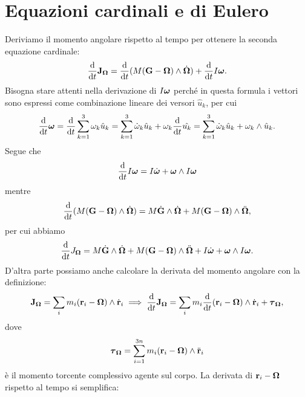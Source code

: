     \section{Equazioni cardinali e di Eulero}
    Deriviamo il momento angolare rispetto al tempo per ottenere la seconda equazione cardinale:
    \begin{equation}
        \frac{\mathrm{d}}{\mathrm{d}t} \mathbf{J}_{\boldsymbol{\Omega}} = \frac{\mathrm{d}}{\mathrm{d}t}(M(\mathbf{G}-\boldsymbol{\Omega})\wedge \dot{\boldsymbol{\Omega}})+ \frac{\mathrm{d}}{\mathrm{d}t} I\boldsymbol{\omega}.
    \end{equation}
    Bisogna stare attenti nella derivazione di $I\boldsymbol{\omega}$ perché in questa formula i vettori sono espressi come combinazione lineare dei versori $\hat{u}_k$, per cui
    \begin{equation}
        \frac{\mathrm{d}}{\mathrm{d}t} \boldsymbol{\omega} = \frac{\mathrm{d}}{\mathrm{d}t} \sum_{k=1}^3 \omega_k \hat{u}_k = \sum_{k=1}^3 \dot{\omega}_k\hat{u}_k + \omega_k\frac{\mathrm{d}}{\mathrm{d}t} \hat{u_k} = \sum_{k=1}^3 \dot{\omega}_k\hat{u}_k +\omega_k\wedge\hat{u}_k.
    \end{equation}
    Segue che
    \begin{equation}
        \frac{\mathrm{d}}{\mathrm{d}t} I\boldsymbol{\omega} = I\dot{\boldsymbol{\omega}}+\boldsymbol{\omega}\wedge I\boldsymbol{\omega}
    \end{equation}
    mentre
    \begin{equation}
        \frac{\mathrm{d}}{\mathrm{d}t}(M(\mathbf{G}-\boldsymbol{\Omega})\wedge \dot{\boldsymbol{\Omega}}) = M\dot{\mathbf{G}}\wedge\dot{\boldsymbol{\Omega}} + M(\mathbf{G}-\boldsymbol{\Omega})\wedge\ddot{\boldsymbol{\Omega}},
    \end{equation}
    per cui abbiamo
    \begin{equation}
        \frac{\mathrm{d}}{\mathrm{d}t} J_{\boldsymbol{\Omega}} = M\dot{\mathbf{G}}\wedge\dot{\boldsymbol{\Omega}} + M(\mathbf{G}-\boldsymbol{\Omega})\wedge\ddot{\boldsymbol{\Omega}} + I\dot{\boldsymbol{\omega}}+\boldsymbol{\omega}\wedge I\boldsymbol{\omega}.
    \end{equation}
    D'altra parte possiamo anche calcolare la derivata del momento angolare con la definizione:
    \begin{equation}
        \mathbf{J}_{\boldsymbol{\Omega}} = \sum_i m_i(\mathbf{r}_i-\boldsymbol{\Omega})\wedge\dot{\mathbf{r}}_i \implies \frac{\mathrm{d}}{\mathrm{d}t} \mathbf{J}_{\boldsymbol{\Omega}} = \sum_i m_i\frac{\mathrm{d}}{\mathrm{d}t}(\mathbf{r}_i-\boldsymbol{\Omega})\wedge\dot{\mathbf{r}}_i + \boldsymbol{\tau}_{\boldsymbol{\Omega}},
    \end{equation}
    dove
    \begin{equation}
        \boldsymbol{\tau}_{\boldsymbol{\Omega}} = \sum_{i=1}^{3n}m_i(\mathbf{r}_i-\boldsymbol{\Omega})\wedge\ddot{\mathbf{r}}_i
    \end{equation}
    è il momento torcente complessivo agente sul corpo. La derivata di $\mathbf{r}_i-\boldsymbol{\Omega}$ rispetto al tempo si semplifica:
